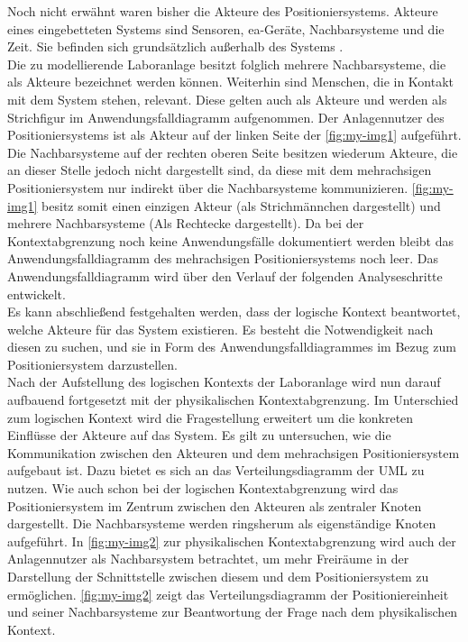 \documentclass[../../../Bachelorarbeit.tex]{subfiles}
\begin{document}
Noch nicht erwähnt waren bisher die Akteure des Positioniersystems. Akteure eines eingebetteten Systems sind Sensoren, \acs{ea}-Geräte, Nachbarsysteme und die Zeit. Sie befinden sich grundsätzlich außerhalb des Systems \cite[262]{Tabeling2006}. \\
Die zu modellierende Laboranlage besitzt folglich mehrere Nachbarsysteme, die als Akteure bezeichnet werden können. Weiterhin sind Menschen, die in Kontakt mit dem System stehen, relevant. Diese gelten auch als Akteure und werden als Strichfigur im Anwendungsfalldiagramm aufgenommen. Der Anlagennutzer des Positioniersystems ist als Akteur auf der linken Seite der \autoref{fig:my-img1} aufgeführt. Die Nachbarsysteme auf der rechten oberen Seite besitzen wiederum Akteure, die an dieser Stelle jedoch nicht dargestellt sind, da diese mit dem mehrachsigen Positioniersystem nur indirekt über die Nachbarsysteme kommunizieren. \autoref{fig:my-img1} besitz somit einen einzigen Akteur (als Strichmännchen dargestellt) und mehrere Nachbarsysteme (Als Rechtecke dargestellt). Da bei der Kontextabgrenzung noch keine Anwendungsfälle dokumentiert werden bleibt das Anwendungsfalldiagramm des mehrachsigen Positioniersystems noch leer. Das Anwendungsfalldiagramm wird über den Verlauf der folgenden Analyseschritte entwickelt.\\
Es kann abschließend festgehalten werden, dass der logische Kontext beantwortet, welche Akteure für das System existieren. Es besteht die Notwendigkeit nach diesen zu suchen, und sie in Form des Anwendungsfalldiagrammes im Bezug zum Positioniersystem darzustellen.\\
Nach der Aufstellung des logischen Kontexts der Laboranlage wird nun darauf aufbauend fortgesetzt mit der physikalischen Kontextabgrenzung. Im Unterschied zum logischen Kontext wird die Fragestellung erweitert um die konkreten Einflüsse der Akteure auf das System. Es gilt zu untersuchen, wie die Kommunikation zwischen den Akteuren und dem mehrachsigen Positioniersystem aufgebaut ist. Dazu bietet es sich an das Verteilungsdiagramm der UML zu nutzen. Wie auch schon bei der logischen Kontextabgrenzung wird das Positioniersystem im Zentrum zwischen den Akteuren als zentraler Knoten dargestellt. Die Nachbarsysteme werden ringsherum als eigenständige Knoten aufgeführt. In \autoref{fig:my-img2} zur physikalischen Kontextabgrenzung wird auch der Anlagennutzer als Nachbarsystem betrachtet, um mehr Freiräume in der Darstellung der Schnittstelle zwischen diesem und dem Positioniersystem zu ermöglichen. \autoref{fig:my-img2} zeigt das Verteilungsdiagramm der Positioniereinheit und seiner Nachbarsysteme zur Beantwortung der Frage nach dem physikalischen Kontext.\\
\end{document}
